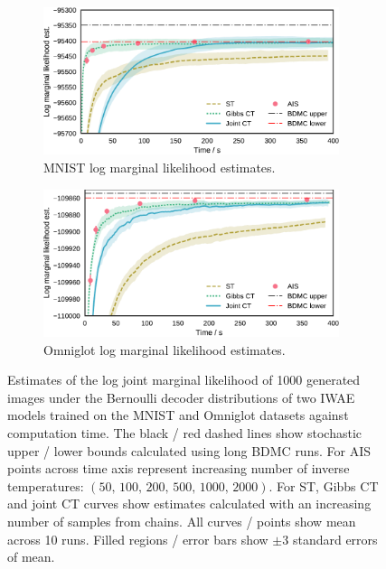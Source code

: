 \begin{figure}[h]
\centering
\begin{subfigure}[t]{\linewidth}
\vskip 0pt
\centering
\includegraphics[width=0.95\textwidth]{images/continuous-tempering/mnist-marginal-likelihood-est-t2}
\caption{MNIST log marginal likelihood estimates.}\label{sfig:mnist-log-marg-lik}
\end{subfigure}%

\begin{subfigure}[t]{\linewidth}
\vskip 0pt
\centering
\includegraphics[width=0.95\textwidth]{images/continuous-tempering/omni-marginal-likelihood-est-t2}
\caption{Omniglot log marginal likelihood estimates.}\label{sfig:omni-log-marg-lik}
\vskip 0pt
\end{subfigure}
\caption[\acs{IWAE} marginal likelihood estimates.]{Estimates of the log joint marginal likelihood of 1000 generated images under the Bernoulli decoder distributions of two \ac{IWAE} models trained on the MNIST and Omniglot datasets against computation time. The black / red dashed lines show stochastic upper / lower bounds calculated using long \ac{BDMC} runs. For \ac{AIS} points across time axis represent increasing number of inverse temperatures: $(50,\,100,\,200,\,500,\,1000,\,2000)$. For \ac{ST}, Gibbs \ac{CT} and joint \ac{CT} curves show estimates calculated with an increasing number of samples from chains. All curves / points show mean across 10 runs. Filled regions / error bars show $\pm 3$ standard errors of mean.
}
\label{fig:iwae-marginal-likelihood-results}
\end{figure}

